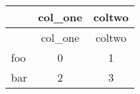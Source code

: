 \begin{longtable}{lcc}
\toprule
 & col\_one & coltwo \\
\midrule
\endfirsthead
\toprule
 & col\_one & coltwo \\
\midrule
\endhead
\bottomrule
\endfoot
foo & 0 & 1 \\
bar & 2 & 3 \\
\end{longtable}

